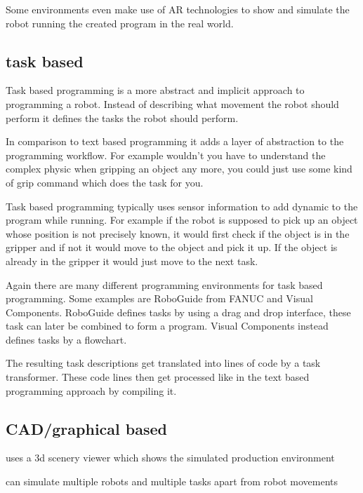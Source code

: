 \documentclass[conference]{IEEEtran}
\begin{document}
        Some environments even make use of AR technologies to show and simulate the robot running the created program in the real world.
        

    \subsection{task based}

        Task based programming is a more abstract and implicit approach to programming a robot.
        Instead of describing what movement the robot should perform it defines the tasks the robot should perform.
       
        In comparison to text based programming it adds a layer of abstraction to the programming workflow. For example wouldn't you have to understand the complex physic when gripping an object any more, you could just use some kind of grip command which does the task for you. %

        Task based programming typically uses sensor information to add dynamic to the program while running. For example if the robot is supposed to pick up an object whose position is not precisely known, it would first check if the object is in the gripper and if not it would move to the object and pick it up. If the object is already in the gripper it would just move to the next task.

        Again there are many different programming environments for task based programming. Some examples are RoboGuide from FANUC and Visual Components. RoboGuide defines tasks by using a drag and drop interface, these task can later be combined to form a program.
        Visual Components instead defines tasks by a flowchart.

        The resulting task descriptions get translated into lines of code by a task transformer. These code lines then get processed like in the text based programming approach by compiling it. %

        

    \subsection{CAD/graphical based}

        uses a 3d scenery viewer which shows the simulated production environment

        can simulate multiple robots and multiple tasks apart from robot movements
\end{document}
